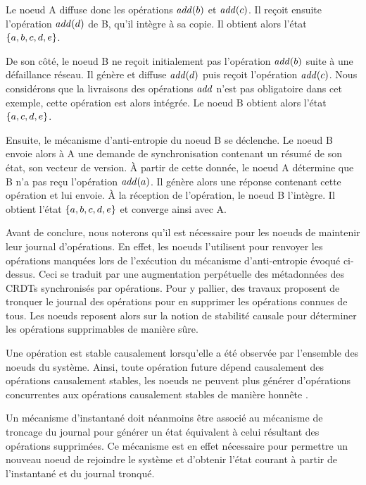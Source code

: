 Le noeud A diffuse donc les opérations $\mathit{add}(b)$ et $\mathit{add}(c)$.
Il reçoit ensuite l'opération $\mathit{add}(d)$ de B, qu'il intègre à sa copie.
Il obtient alors l'état $\left\{a,b,c,d,e\right\}$.

De son côté, le noeud B ne reçoit initialement pas l'opération $\mathit{add}(b)$ suite à une défaillance réseau.
Il génère et diffuse $\mathit{add}(d)$ puis reçoit l'opération $\mathit{add}(c)$.
Nous considérons que la livraisons des opérations $\mathit{add}$ n'est pas obligatoire dans cet exemple, cette opération est alors intégrée.
Le noeud B obtient alors l'état $\left\{a,c,d,e\right\}$.

Ensuite, le mécanisme d'anti-entropie du noeud B se déclenche.
Le noeud B envoie alors à A une demande de synchronisation contenant un résumé de son état, \eg son vecteur de version.
À partir de cette donnée, le noeud A détermine que B n'a pas reçu l'opération $\mathit{add}(a)$.
Il génère alors une réponse contenant cette opération et lui envoie.
À la réception de l'opération, le noeud B l'intègre.
Il obtient l'état $\left\{a,b,c,d,e\right\}$ et converge ainsi avec A.

Avant de conclure, nous noterons qu'il est nécessaire pour les noeuds de maintenir leur journal d'opérations.
En effet, les noeuds l'utilisent pour renvoyer les opérations manquées lors de l'exécution du mécanisme d'anti-entropie évoqué ci-dessus.
Ceci se traduit par une augmentation perpétuelle des métadonnées des \acp{CRDT} synchronisés par opérations.
Pour y pallier, des travaux \cite{baquero2017pure, 2021-improving-reactivity-pure-op-based-crdts-bauwens} proposent de tronquer le journal des opérations pour en supprimer les opérations connues de tous.
Les noeuds reposent alors sur la notion de stabilité causale pour déterminer les opérations supprimables de manière sûre.

\begin{definition}
  Une opération est stable causalement lorsqu'elle a été observée par l'ensemble des noeuds du système.
  Ainsi, toute opération future dépend causalement des opérations causalement stables, \ie les noeuds ne peuvent plus générer d'opérations concurrentes aux opérations causalement stables de manière honnête .
\end{definition}

Un mécanisme d'instantané  doit néanmoins être associé au mécanisme de troncage du journal pour générer un état équivalent à celui résultant des opérations supprimées.
Ce mécanisme est en effet nécessaire pour permettre un nouveau noeud de rejoindre le système et d'obtenir l'état courant à partir de l'instantané et du journal tronqué.

